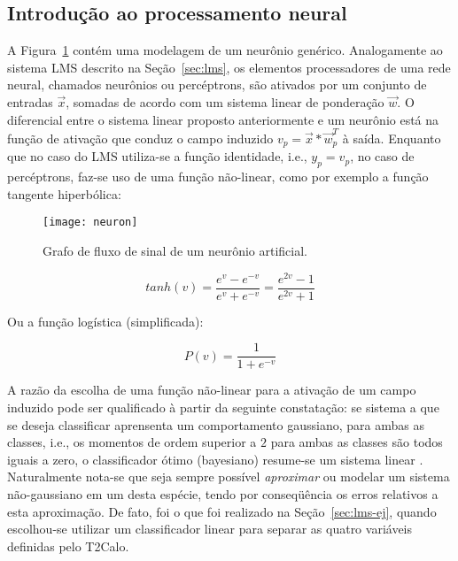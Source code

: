 \subsection{Introdução ao processamento neural}

A Figura~\ref{fig:neuron} contém uma modelagem de um neurônio
genérico. Analogamente ao sistema LMS descrito na Seção~\ref{sec:lms}, os
elementos processadores de uma rede neural, chamados neurônios ou percéptrons,
são ativados por um conjunto de entradas $\overrightarrow{x}$, somadas de
acordo com um sistema linear de ponderação $\overrightarrow{w}$. O diferencial
entre o sistema linear proposto anteriormente e um neurônio está na função de
ativação que conduz o campo induzido $v_p =
\overrightarrow{x}*\overrightarrow{w}_{p}^{T}$ à saída. Enquanto que
no caso do LMS utiliza-se a função identidade, i.e., $y_p = v_p$, no caso de
percéptrons, faz-se uso de uma função não-linear, como por exemplo a função
tangente hiperbólica:

\begin{figure}
\begin{center}
\texttt{[image: neuron]}
\end{center}
\caption{Grafo de fluxo de sinal de um neurônio artificial.}
\label{fig:neuron}
\end{figure}

\begin{equation}
tanh(v) = \frac{e^v - e^{-v}}{e^v + e^{-v}} = \frac{e^{2v} - 1}{e^{2v} + 1}
\label{eq:tanh}
\end{equation}

Ou a função logística (simplificada):

\begin{equation}
P(v) = \frac{1}{1 + e^{-v}}
\label{eq:logf}
\end{equation}

A razão da escolha de uma função não-linear para a ativação de um campo
induzido pode ser qualificado à partir da seguinte constatação: se sistema a
que se deseja classificar aprensenta um comportamento gaussiano, para ambas as
classes, i.e., os momentos de ordem superior a $2$ para ambas as classes são
todos iguais a zero, o classificador ótimo (bayesiano) resume-se um sistema
linear \cite{haykin}. Naturalmente nota-se que seja sempre possível
\textit{aproximar} ou modelar um sistema não-gaussiano em um desta espécie,
tendo por conseqüência os erros relativos a esta aproximação. De fato, foi o
que foi realizado na Seção~\ref{sec:lms-ej}, quando escolhou-se utilizar um
classificador linear para separar as quatro variáveis definidas pelo T2Calo.

